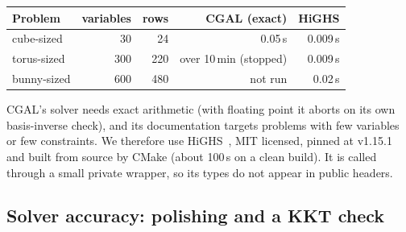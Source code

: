 \documentclass[11pt]{article}
\theoremstyle{definition}
\begin{document}
\begin{center}
\small
\begin{tabular}{@{}lrrrr@{}}
\toprule
Problem & variables & rows & CGAL (exact) & HiGHS \\
\midrule
cube-sized & 30 & 24 & 0.05\,s & 0.009\,s \\
torus-sized & 300 & 220 & over 10\,min (stopped) & 0.009\,s \\
bunny-sized & 600 & 480 & not run & 0.02\,s \\
\bottomrule
\end{tabular}
\end{center}

CGAL's solver needs exact arithmetic (with floating point it aborts on its own
basis-inverse check), and its documentation targets problems with few
variables or few constraints. We therefore use HiGHS~\cite{highs}, MIT
licensed, pinned at v1.15.1 and built from source by CMake (about 100\,s on a
clean build). It is called through a small private wrapper, so its types do
not appear in public headers.

\subsection{Solver accuracy: polishing and a KKT check}
\end{document}
